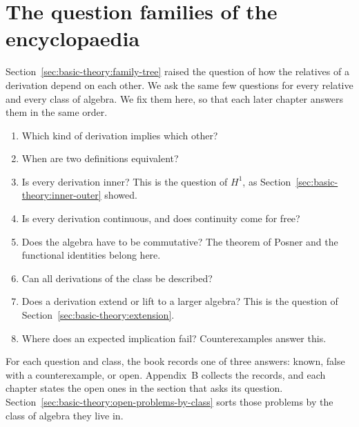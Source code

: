 \section{The question families of the encyclopaedia}\label{sec:basic-theory:question-families}

Section~\ref{sec:basic-theory:family-tree} raised the question of how the
relatives of a derivation depend on each other. We ask the same few questions
for every relative and every class of algebra. We fix them here, so that each
later chapter answers them in the same order.

\begin{enumerate}
\item Which kind of derivation implies which other?
\item When are two definitions equivalent?
\item Is every derivation inner? This is the question of $H^1$, as
Section~\ref{sec:basic-theory:inner-outer} showed.
\item Is every derivation continuous, and does continuity come for free?
\item Does the algebra have to be commutative? The theorem of Posner and the
functional identities belong here.
\item Can all derivations of the class be described?
\item Does a derivation extend or lift to a larger algebra? This is the question
of Section~\ref{sec:basic-theory:extension}.
\item Where does an expected implication fail? Counterexamples answer this.
\end{enumerate}

For each question and class, the book records one of three answers: known, false
with a counterexample, or open. Appendix~B collects the records, and each
chapter states the open ones in the section that asks its question.
Section~\ref{sec:basic-theory:open-problems-by-class} sorts those problems by
the class of algebra they live in.
